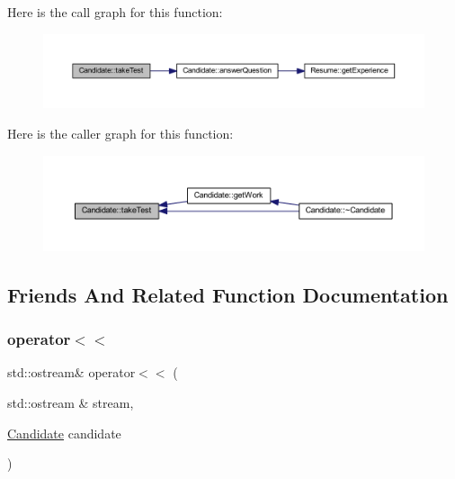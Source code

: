 Here is the call graph for this function\+:
\nopagebreak
\begin{figure}[H]
\begin{center}
\leavevmode
\includegraphics[width=350pt]{class_candidate_ab30f3859931c02d8cf69acb49a80c12e_cgraph}
\end{center}
\end{figure}
Here is the caller graph for this function\+:
\nopagebreak
\begin{figure}[H]
\begin{center}
\leavevmode
\includegraphics[width=350pt]{class_candidate_ab30f3859931c02d8cf69acb49a80c12e_icgraph}
\end{center}
\end{figure}


\subsection{Friends And Related Function Documentation}
\hypertarget{class_candidate_ae89bdf092b73462b5a958aae6dbd35f0}{}\label{class_candidate_ae89bdf092b73462b5a958aae6dbd35f0} 
\subsubsection{\texorpdfstring{operator$<$$<$}{operator<<}}
{\footnotesize\ttfamily std\+::ostream\& operator$<$$<$ (\begin{DoxyParamCaption}\item[{std\+::ostream \&}]{stream,  }\item[{\hyperlink{class_candidate}{Candidate}}]{candidate }\end{DoxyParamCaption})\hspace{0.3cm}{\ttfamily [friend]}}




